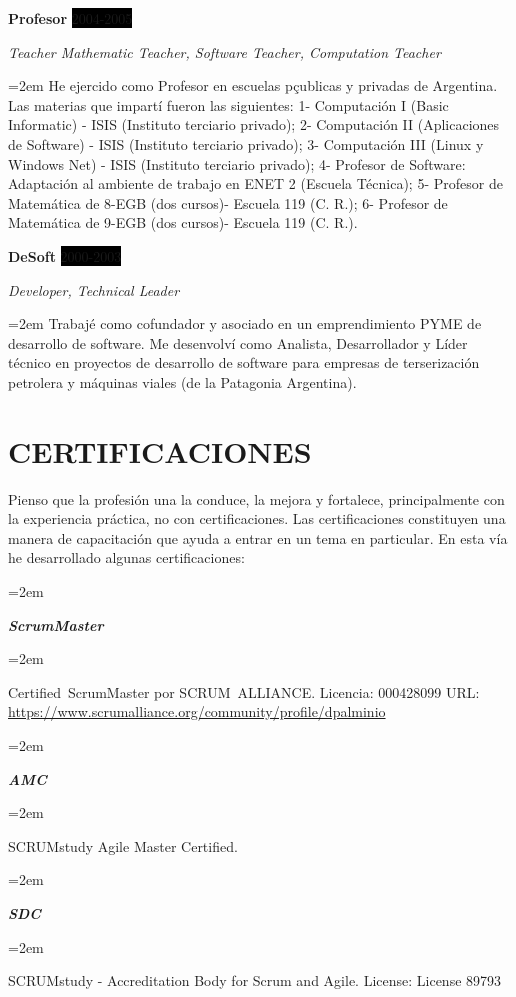 \documentclass[paper=a4,fontsize=11pt]{scrartcl} %
\newlength{\spacebox}
\newcommand{\sepspace}{\vspace*{1em}}		%
\newcommand{\NewPart}[1]{\section*{\uppercase{#1}}}
\newcommand{\CertificatesEntry}[2]{      %
		\noindent\hangindent=2em\hangafter=0 %
		\parbox{\spacebox}{        %
		\textit{#1}}			   %
		\hspace{1.5em} #2 \par}    %
\newcommand{\EducationEntry}[4]{
		\noindent \textbf{#1} \hfill      %
		\colorbox{Black}{%
			\parbox{6em}{%
			\hfill\color{White}#2}} \par  %
		\noindent \textit{#3} \par        %
		\noindent\hangindent=2em\hangafter=0 \small #4 %
		\normalsize \par}
\newcommand{\WorkEntry}[4]{				  %
		\noindent \textbf{#1} \hfill      %
		\colorbox{Black}{\color{White}#2} \par  %
		\noindent \textit{#3} \par              %
		\noindent\hangindent=2em\hangafter=0 \small #4 %
		\normalsize \par}
\begin{document}
\sepspace

\WorkEntry{Profesor}{2004-2005}{Teacher Mathematic Teacher, Software Teacher, Computation Teacher}
{He ejercido como Profesor en escuelas pçublicas y privadas de Argentina. Las materias que impartí fueron las siguientes: 
1- Computación I (Basic Informatic) - ISIS (Instituto terciario privado); 
2- Computación II (Aplicaciones de Software) - ISIS (Instituto terciario privado); 
3- Computación III (Linux y Windows Net) - ISIS (Instituto terciario privado); 
4- Profesor de Software: Adaptación al ambiente de trabajo en ENET 2 (Escuela Técnica); 
5- Profesor de Matemática de 8-EGB  (dos cursos)- Escuela 119 (C. R.); 
6- Profesor de Matemática de 9-EGB (dos cursos)- Escuela 119 (C. R.).
}

\sepspace

\WorkEntry{DeSoft}{2000-2003}{Developer, Technical Leader}{
Trabajé como cofundador y asociado en un emprendimiento PYME de desarrollo de software. Me desenvolví como Analista, Desarrollador y Líder técnico en proyectos de desarrollo de software para empresas de terserización petrolera y máquinas viales (de la Patagonia Argentina).}

\sepspace

\NewPart{Certificaciones}{}

Pienso que la profesión una la conduce, la mejora y fortalece, principalmente con la experiencia práctica, no con certificaciones. Las certificaciones constituyen una manera de capacitación que ayuda a entrar en un tema en particular. En esta vía he desarrollado algunas certificaciones:
\sepspace

\CertificatesEntry{\large{\textbf{ScrumMaster}}}{}
\CertificatesEntry{}{
Certified ScrumMaster por SCRUM ALLIANCE.\newline
Licencia: 000428099\newline
URL: \url{https://www.scrumalliance.org/community/profile/dpalminio}
}
\sepspace

\CertificatesEntry{\large{\textbf{AMC}}}{}
\CertificatesEntry{}{
SCRUMstudy Agile Master Certified.\newline
}
\sepspace

\CertificatesEntry{\large{\textbf{SDC}}}{}
\CertificatesEntry{}{
SCRUMstudy - Accreditation Body for Scrum and Agile.\newline
License: License 89793\newline
}
\sepspace
\end{document}
